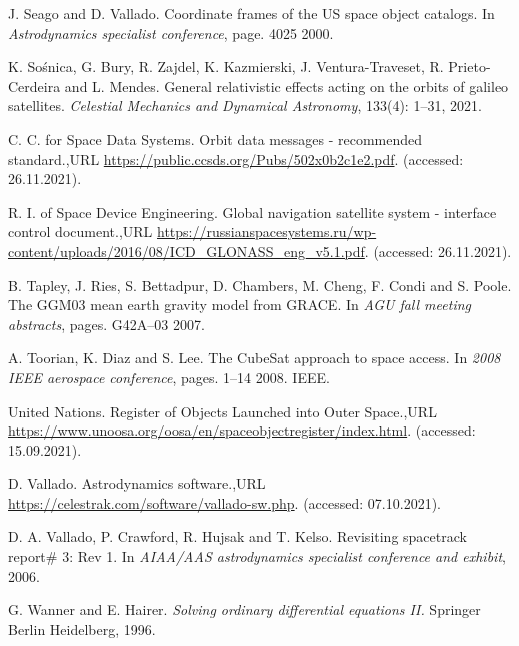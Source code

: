 \begin{CSLReferences}{1}{0}
\leavevmode{}%
J. Seago and D. Vallado. Coordinate frames of the US space object catalogs. In \emph{Astrodynamics specialist conference}, page. 4025 2000.

\leavevmode{}%
K. Sośnica, G. Bury, R. Zajdel, K. Kazmierski, J. Ventura-Traveset, R. Prieto-Cerdeira and L. Mendes. General relativistic effects acting on the orbits of galileo satellites. \emph{Celestial Mechanics and Dynamical Astronomy}, 133(4): 1--31, 2021.

\leavevmode{}%
C. C. for Space Data Systems. Orbit data messages - recommended standard.,URL \url{https://public.ccsds.org/Pubs/502x0b2c1e2.pdf}. (accessed: 26.11.2021).

\leavevmode{}%
R. I. of Space Device Engineering. Global navigation satellite system - interface control document.,URL \url{https://russianspacesystems.ru/wp-content/uploads/2016/08/ICD_GLONASS_eng_v5.1.pdf}. (accessed: 26.11.2021).

\leavevmode{}%
B. Tapley, J. Ries, S. Bettadpur, D. Chambers, M. Cheng, F. Condi and S. Poole. The GGM03 mean earth gravity model from GRACE. In \emph{AGU fall meeting abstracts}, pages. G42A--03 2007.

\leavevmode{}%
A. Toorian, K. Diaz and S. Lee. The CubeSat approach to space access. In \emph{2008 IEEE aerospace conference}, pages. 1--14 2008. IEEE.

\leavevmode{}%
United Nations. {Register of Objects Launched into Outer Space}.,URL \url{https://www.unoosa.org/oosa/en/spaceobjectregister/index.html}. (accessed: 15.09.2021).

\leavevmode{}%
D. Vallado. Astrodynamics software.,URL \url{https://celestrak.com/software/vallado-sw.php}. (accessed: 07.10.2021).

\leavevmode{}%
D. A. Vallado, P. Crawford, R. Hujsak and T. Kelso. Revisiting spacetrack report\# 3: Rev 1. In \emph{AIAA/AAS astrodynamics specialist conference and exhibit}, 2006.

\leavevmode{}%
G. Wanner and E. Hairer. \emph{Solving ordinary differential equations II.} Springer Berlin Heidelberg, 1996.

\end{CSLReferences}


